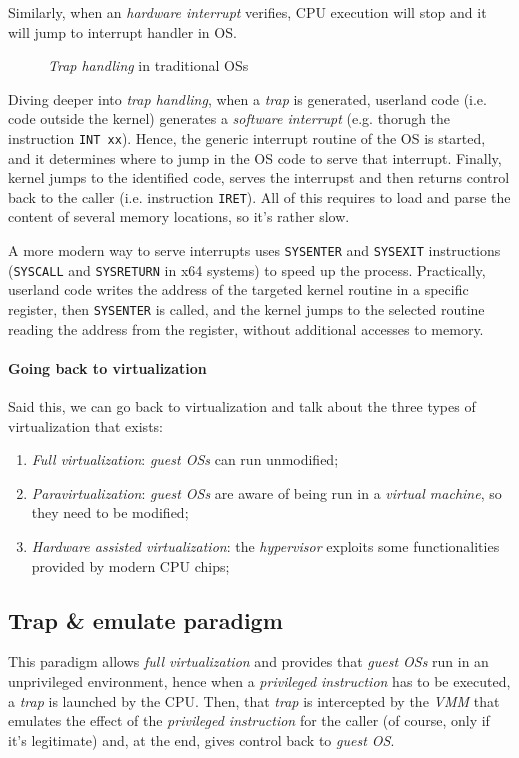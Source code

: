 Similarly, when an \emph{hardware interrupt} verifies, CPU execution will stop
and it will jump to interrupt handler in OS.

\begin{figure}[h!]
    \centering
    \caption{\emph{Trap handling} in traditional OSs}
\end{figure}

\noindent
Diving deeper into \emph{trap handling}, when a \emph{trap} is generated,
userland code (i.e. code outside the kernel) generates a \emph{software
interrupt} (e.g. thorugh the instruction \texttt{INT xx}). Hence, the generic
interrupt routine of the OS is started, and it determines where to jump in the
OS code to serve that interrupt. Finally, kernel jumps to the identified code,
serves the interrupst and then returns control back to the caller (i.e.
instruction \texttt{IRET}). All of this requires to load and parse the content
of several memory locations, so it's rather slow.

A more modern way to serve interrupts uses \texttt{SYSENTER} and
\texttt{SYSEXIT} instructions (\texttt{SYSCALL} and \texttt{SYSRETURN} in
x64 systems) to speed up the process. Practically, userland code writes the
address of the targeted kernel routine in a specific register, then
\texttt{SYSENTER} is called, and the kernel jumps to the selected routine
reading the address from the register, without additional accesses to memory.

\paragraph{Going back to virtualization}
Said this, we can go back to virtualization and talk about the three types
of virtualization that exists:
\begin{enumerate}
    \item\emph{Full virtualization}: \emph{guest OSs} can run unmodified;
    \item\emph{Paravirtualization}: \emph{guest OSs} are aware of being run
    in a \emph{virtual machine}, so they need to be modified;
    \item\emph{Hardware assisted virtualization}: the \emph{hypervisor} exploits
    some functionalities provided by modern CPU chips;
\end{enumerate}

\subsection{Trap \& emulate paradigm}
This paradigm allows \emph{full virtualization} and provides that \emph{guest
OSs} run in an unprivileged environment, hence when a \emph{privileged
instruction} has to be executed, a \emph{trap} is launched by the CPU. Then,
that \emph{trap} is intercepted by the \emph{VMM} that emulates the effect of
the \emph{privileged instruction} for the caller (of course, only if it's
legitimate) and, at the end, gives control back to \emph{guest OS}.

